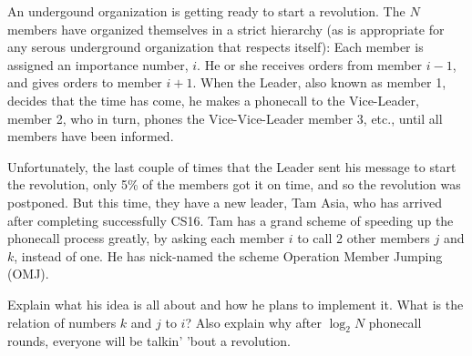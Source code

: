 An undergound organization is getting ready to start a revolution.
The $N$ members have organized themselves in a strict 
hierarchy (as is appropriate for any serous underground organization 
that respects itself):
Each member is assigned an importance number, $i$. He or she receives orders
from member $i-1$, and gives orders to member $i+1$. 
When the Leader, also known as member 1, decides that the time has come, he 
makes a phonecall to the Vice-Leader, member 2, who in turn, phones
the Vice-Vice-Leader member 3, etc., until all members have been informed.

Unfortunately, the last couple of times that the Leader sent his
message to start the revolution, only 5\%  of the members got it on
time, and so the revolution was postponed. But this time, they have a
new leader, Tam Asia, who has arrived after completing successfully
CS16.  Tam has a grand scheme of speeding up the phonecall process
greatly, by asking each member $i$ to call 2 other members $j$ and
$k$, instead of one. He has nick-named the scheme Operation Member
Jumping (OMJ).

Explain what his idea is all about and how he plans to implement it.
What is the relation of numbers $k$ and $j$ to $i$?  Also explain why
after $\log_2  N$ phonecall rounds, everyone will be talkin' 'bout a
revolution.

